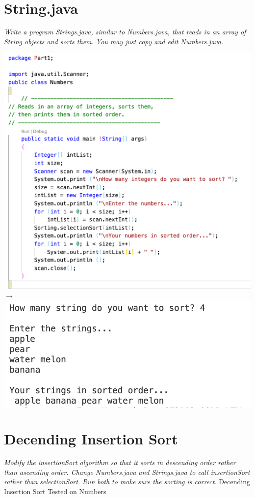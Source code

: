 \documentclass[hidelinks,12pt]{article}
\begin{document}
\section{String.java}
\textit{Write a program Strings.java, similar to Numbers.java, that reads in an array of String objects and sorts
them. You may just copy and edit Numbers.java.}

\includegraphics[scale=0.4]{StringCode.png}
$\longrightarrow$ \includegraphics[scale=0.5]{StringsResult.png}

\section{Decending Insertion Sort}
\textit{Modify the insertionSort algorithm so that it sorts in descending order rather than ascending order.
Change Numbers.java and Strings.java to call insertionSort rather than selectionSort. Run both to make
sure the sorting is correct.}
Decending Insertion Sort \qquad\qquad\qquad\qquad\qquad\quad Tested on Numbers
\end{document}
